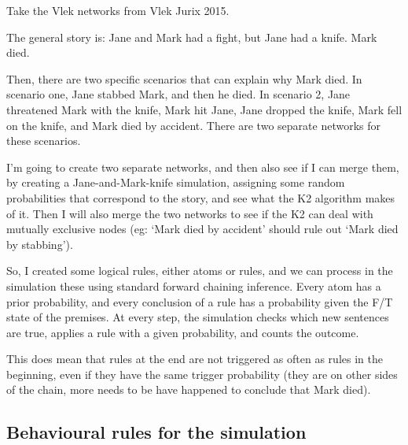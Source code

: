 Take the Vlek networks from Vlek Jurix 2015.

The general story is: Jane and Mark had a fight, but Jane had a knife. Mark died. 

Then, there are two specific scenarios that can explain why Mark died. In scenario one, Jane stabbed Mark, and then he died. In scenario 2, Jane threatened Mark with the knife, Mark hit Jane, Jane dropped the knife, Mark fell on the knife, and Mark died by accident. There are two separate networks for these scenarios.

I'm going to create two separate networks, and then also see if I can merge them, by creating a Jane-and-Mark-knife simulation, assigning some random probabilities that correspond to the story, and see what the K2 algorithm makes of it. Then I will also merge the two networks to see if the K2 can deal with mutually exclusive nodes (eg: `Mark died by accident' should rule out `Mark died by stabbing').

So, I created some logical rules, either atoms or rules, and we can process in the simulation these using standard forward chaining inference. Every atom has a prior probability, and every conclusion of a rule has a probability given the F/T state of the premises. At every step, the simulation checks which new sentences are true, applies a rule with a given probability, and counts the outcome.

This does mean that rules at the end are not triggered as often as rules in the beginning, even if they have the same trigger probability (they are on other sides of the chain, more needs to be have happened to conclude that Mark died).

\subsection{Behavioural rules for the simulation}

